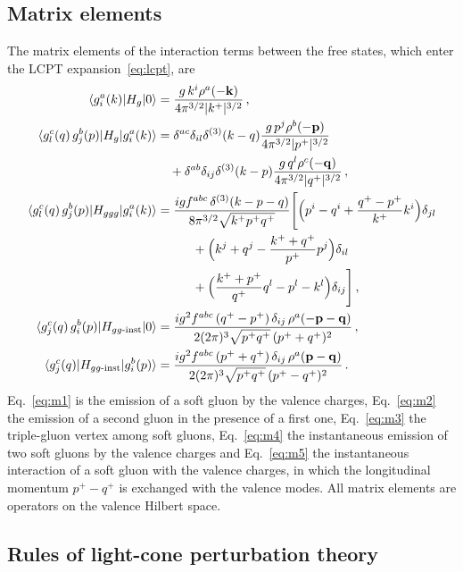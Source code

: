 \subsection{Matrix elements}\label{app:matrixelements}

The matrix elements of the interaction terms between the free states, which enter the LCPT expansion~\eqref{eq:lcpt}, are~\cite{Radhakrishnan:2026soft}
\begin{align}
\braket{g^a_i(k)|H_g|0}&=\frac{g\,k^i\rho^a(-\mathbf{k})}{4\pi^{3/2}|k^+|^{3/2}}\,,\label{eq:m1}\\
\braket{g^c_l(q)\,g^b_j(p)|H_g|g^a_i(k)}&=\delta^{ac}\delta_{il}\delta^{(3)}(k-q)\frac{g\,p^j\rho^b(-\mathbf{p})}{4\pi^{3/2}|p^+|^{3/2}}\notag\\&\quad+\delta^{ab}\delta_{ij}\delta^{(3)}(k-p)\frac{g\,q^l\rho^c(-\mathbf{q})}{4\pi^{3/2}|q^+|^{3/2}}\,,\label{eq:m2}\\
\braket{g^c_l(q)\,g^b_j(p)|H_{ggg}|g^a_i(k)}&=\frac{igf^{abc}\,\delta^{(3)}(k-p-q)}{8\pi^{3/2}\sqrt{k^+p^+q^+}}\Bigg[\Big(p^i-q^i+\frac{q^+-p^+}{k^+}k^i\Big)\delta_{jl}\notag\\&\hspace{1cm}+\Big(k^j+q^j-\frac{k^++q^+}{p^+}p^j\Big)\delta_{il}
\notag\\&\hspace{1cm}
+\Big(\frac{k^++p^+}{q^+}q^l-p^l-k^l\Big)\delta_{ij}\Bigg]\,,\label{eq:m3}\\
\braket{g^c_j(q)\,g^b_i(p)|H_{gg\text{-inst}}|0}&
=\frac{ig^2f^{abc}\,(q^+-p^+)\,\delta_{ij}\,\rho^a(-\mathbf{p}-\mathbf{q})}{2(2\pi)^3\sqrt{p^+q^+}\,(p^++q^+)^2}\,,\label{eq:m4}\\
\braket{g^c_j(q)|H_{gg\text{-inst}}|g^b_i(p)}&
=\frac{ig^2f^{abc}\,(p^++q^+)\,\delta_{ij}\,\rho^a(\mathbf{p}-\mathbf{q})}{2(2\pi)^3\sqrt{p^+q^+}\,(p^+-q^+)^2}\,.\label{eq:m5}
\end{align}
Eq.~\eqref{eq:m1} is the emission of a soft gluon by the valence charges, Eq.~\eqref{eq:m2} the emission of a second gluon in the presence of a first one, Eq.~\eqref{eq:m3} the triple-gluon vertex among soft gluons, Eq.~\eqref{eq:m4} the instantaneous emission of two soft gluons by the valence charges and Eq.~\eqref{eq:m5} the instantaneous interaction of a soft gluon with the valence charges, in which the longitudinal momentum $p^+-q^+$ is exchanged with the valence modes. All matrix elements are operators on the valence Hilbert space.

\subsection{Rules of light-cone perturbation theory}\label{app:lcptrules}

